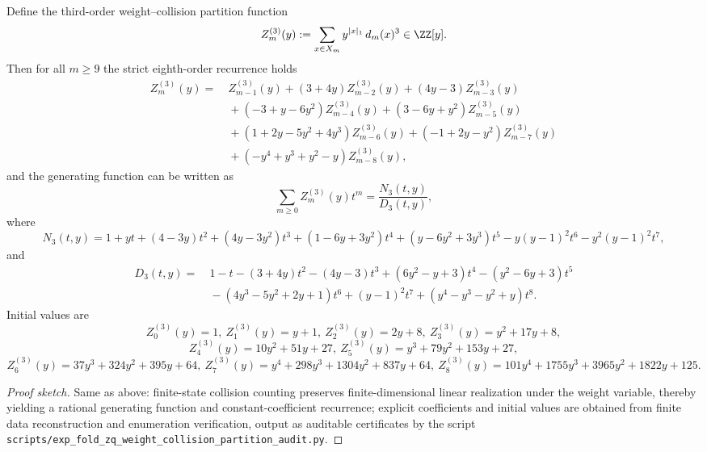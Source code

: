 \begin{conclusion}[Weight--collision partition function for \texorpdfstring{$(q=3)$}{(q=3)}: eighth-order recurrence and rational generating function]\label{con:xi-terminal-zm3-order8-rational}
Define the third-order weight--collision partition function
\[
Z_m^{(3)}(y):=\sum_{x\in X_m} y^{|x|_1}\,d_m(x)^3\in\ZZ[y].
\]
Then for all \(m\ge 9\) the strict eighth-order recurrence holds
\[
\begin{aligned}
Z_m^{(3)}(y)=&\ Z_{m-1}^{(3)}(y)+(3+4y)Z_{m-2}^{(3)}(y)+(4y-3)Z_{m-3}^{(3)}(y)\\
&\ +(-3+y-6y^2)Z_{m-4}^{(3)}(y)+(3-6y+y^2)Z_{m-5}^{(3)}(y)\\
&\ +(1+2y-5y^2+4y^3)Z_{m-6}^{(3)}(y)+(-1+2y-y^2)Z_{m-7}^{(3)}(y)\\
&\ +(-y^4+y^3+y^2-y)Z_{m-8}^{(3)}(y),
\end{aligned}
\]
and the generating function can be written as
\[
\sum_{m\ge 0} Z_m^{(3)}(y)t^m=\frac{N_3(t,y)}{D_3(t,y)},
\]
where
\[
N_3(t,y)=1+yt+(4-3y)t^2+(4y-3y^2)t^3+(1-6y+3y^2)t^4+(y-6y^2+3y^3)t^5-y(y-1)^2t^6-y^2(y-1)^2t^7,
\]
and
\[
\begin{aligned}
D_3(t,y)=&\ 1-t-(3+4y)t^2-(4y-3)t^3+(6y^2-y+3)t^4-(y^2-6y+3)t^5\\
&\ -(4y^3-5y^2+2y+1)t^6+(y-1)^2t^7+(y^4-y^3-y^2+y)t^8.
\end{aligned}
\]
Initial values are
\[
Z_0^{(3)}(y)=1,\
Z_1^{(3)}(y)=y+1,\
Z_2^{(3)}(y)=2y+8,\
Z_3^{(3)}(y)=y^2+17y+8,
\]
\[
Z_4^{(3)}(y)=10y^2+51y+27,\
Z_5^{(3)}(y)=y^3+79y^2+153y+27,
\]
\[
Z_6^{(3)}(y)=37y^3+324y^2+395y+64,\
Z_7^{(3)}(y)=y^4+298y^3+1304y^2+837y+64,\
Z_8^{(3)}(y)=101y^4+1755y^3+3965y^2+1822y+125.
\]
\end{conclusion}
\begin{proof}[Proof sketch]
Same as above: finite-state collision counting preserves finite-dimensional linear realization under the weight variable,
thereby yielding a rational generating function and constant-coefficient recurrence; explicit coefficients and initial values are obtained from finite data reconstruction and enumeration verification,
output as auditable certificates by the script \texttt{scripts/exp\_fold\_zq\_weight\_collision\_partition\_audit.py}.
\end{proof}

